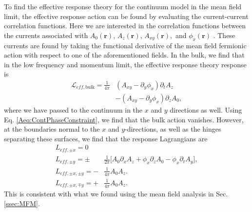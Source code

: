 \documentclass[prb,aps,twocolumn,groupaddress,floatfix]{revtex4-1}
\begin{document}
To find the effective response theory for the continuum model in the mean field limit, the effective response action can be found by evaluating the current-current correlation functions. Here we are interested in the correlation functions between the currents  associated with $A_0(\bm{r})$, $A_z(\bm{r})$, $A_{xy}(\bm{r}),$ and $\phi_x(\bm{r})$ . These currents are found by taking the functional derivative of the mean field fermionic action with respect to one of the aforementioned fields. 
In the bulk, we find that in the low frequency and momentum limit, the effective response theory response is
\begin{equation}
\begin{split}
\mathcal{L}_{eff, \text{bulk}} = \frac{1}{4\pi}& (A_{xy} -  \partial_y \phi_x ) \partial_t A_z\\& - (A_{xy} -  \partial_y \phi_x) \partial_z A_0,
\end{split}
\end{equation}
where we have passed to the continuum in the $x$ and $y$ directions as well. Using Eq. \ref{Aeq:ContPhaseConstraint}, we find that the bulk action vanishes. However, at the boundaries normal to the $x$ and $y$-directions, as well as the hinges separating these surfaces, we find that the response Lagrangians are 
\begin{equation}
\begin{split}
L_{eff,\pm x} = 0\\
L_{eff,\pm y} =\pm & \frac{1}{2\pi}\big[ A_0 \partial_x A_z + \phi_x \partial_z A_0 - \phi_x\partial_t A_y \big],\\
L_{eff,\pm x , \pm y} =- & \frac{1}{4\pi} A_0A_z. \\
L_{eff,\pm x, \mp y} = + & \frac{1}{4\pi} A_0A_z.
\end{split}\label{Aeq:EffectiveActionBoundM}
\end{equation}
This is consistent with what we found using the mean field analysis in Sec. \ref{ssec:MFM}.
\end{document}

